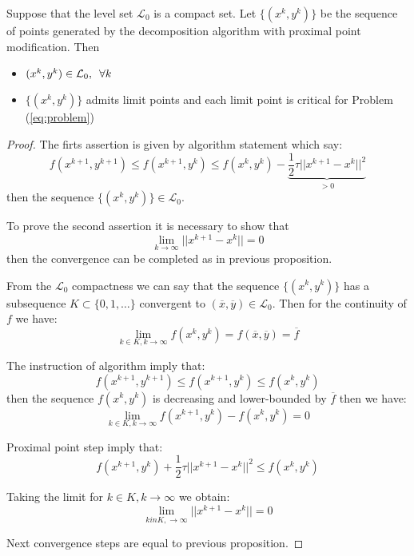 \begin{proposition}
Suppose that the level set $\mathcal{L}_0$ is a compact set. Let $\{(x^k, y^k)\}$ be the sequence of points generated by the decomposition algorithm with proximal point modification. Then
\begin{itemize}
\item $(x^k, y^k) \in \mathcal{L}_0, \enskip \forall k$ 
\item  $\{(x^k, y^k)\}$ admits limit points and each limit point is critical for Problem (\ref{eq:problem})
\end{itemize}
\end{proposition}
\begin{proof}
The firts assertion is given by algorithm statement which say:
\begin{equation}
f(x^{k+1},y^{k+1})\le f(x^{k+1},y^k)\le f(x^k,y^k)- \underbrace{\frac{1}{2}\tau ||x^{k+1}-x^{k}||^2}_{>0}
\end{equation}
then the sequence $\{(x^k,y^k)\} \in \mathcal{L}_0$.

To prove the second assertion it is necessary to show that
\begin{equation}
\lim_{k \rightarrow \infty} ||x^{k+1}-x^{k}||=0
\end{equation}
then the convergence can be completed as in previous proposition.


From the $\mathcal{L}_0$ compactness we can say that the sequence $\{(x^k,y^k)\}$ has a subsequence $K \subset \{0,1,\ldots\}$ convergent to $(\overline{x},\overline{y}) \in \mathcal{L}_0$. Then for the continuity of $f$ we have:
\begin{equation}
\lim_{k \in K, k \rightarrow \infty}f(x^k,y^k)=f(\overline{x},\overline{y})= \overline{f}
\end{equation}

The instruction of algorithm imply that:
\begin{equation}
f(x^{k+1},y^{k+1})\le f(x^{k+1},y^{k})\le f(x^k,y^k)
\end{equation}
then the sequence $f(x^k,y^k)$ is decreasing and lower-bounded by $\overline{f}$ then we have:
\begin{equation}
\lim_{k \in K, k \rightarrow \infty} f(x^{k+1},y^{k})-f(x^{k},y^{k})=0
\end{equation}

Proximal point step imply that:
\begin{equation}
f(x^{k+1},y^{k})+\frac{1}{2}\tau||x^{k+1}-x^{k}||^2 \le f(x^{k},y^{k})
\end{equation}

Taking the limit for $k \in K, k \rightarrow \infty$ we obtain:
\begin{equation}
\lim_{k in K, \rightarrow \infty} ||x^{k+1}-x^{k}||=0
\end{equation}

Next convergence steps are equal to previous proposition.
\end{proof}

